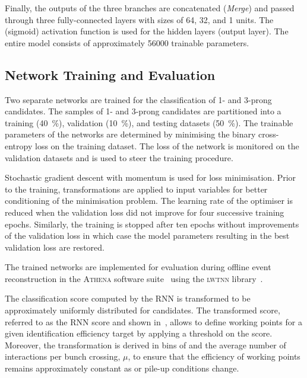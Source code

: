 Finally, the outputs of the three branches are concatenated
(\emph{Merge}) and passed through three fully-connected layers with
sizes of 64, 32, and 1 units. The \ReLU (sigmoid) activation function
is used for the hidden layers (output layer). The entire model
consists of approximately \num{56000} trainable parameters.


\subsection{Network Training and Evaluation}

Two separate networks are trained for the classification of 1- and
3-prong \tauhadvis candidates. The samples of 1- and 3-prong
\tauhadvis candidates are partitioned into a training
(\SI{40}{\percent}), validation (\SI{10}{\percent}), and testing
datasets (\SI{50}{\percent}). The trainable parameters of the networks
are determined by minimising the binary cross-entropy loss on the
training dataset. The loss of the network is monitored on the
validation datasets and is used to steer the training procedure.

Stochastic gradient descent with momentum is used for loss
minimisation. Prior to the training, transformations are applied to
input variables for better conditioning of the minimisation
problem. The learning rate of the optimiser is reduced when the
validation loss did not improve for four successive training
epochs. Similarly, the training is stopped after ten epochs without
improvements of the validation loss in which case the model parameters
resulting in the best validation loss are restored.

The trained networks are implemented for evaluation during offline
event reconstruction in the \textsc{Athena} software
suite~\cite{ATL-SOFT-PUB-2021-001} using the \textsc{lwtnn}
library~\cite{lwtnn}.

The classification score computed by the RNN \tauid is transformed to
be approximately uniformly distributed for \truetauhadvis
candidates. The transformed score, referred to as the RNN score and
shown in~, allows to define working
points for a given \truetauhadvis identification efficiency target by
applying a threshold on the score. Moreover, the transformation is
derived in bins of \tauhadvis \pT and the average number of
interactions per bunch crossing, $\mu$, to ensure that the
\truetauhadvis efficiency of working points remains approximately
constant as \tauhadvis \pT or pile-up conditions change.

